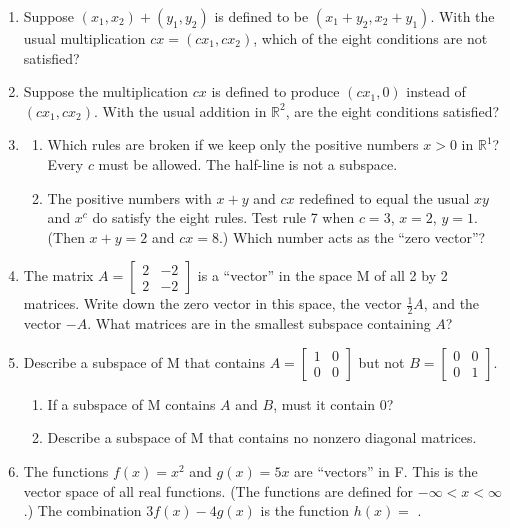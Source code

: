 \documentclass[14pt, a4paper]{article}
\begin{document}
\begin{enumerate}
    \item Suppose $(x_1,x_2)+(y_1,y_2)$ is defined to be $(x_1+y_2,x_2+y_1)$. With the usual multiplication $cx=(cx_1,cx_2)$, which of the eight conditions are not satisfied?

    \item Suppose the multiplication $cx$ is defined to produce $(cx_1,0)$ instead of $(cx_1,cx_2)$. With the usual addition in $\mathbb{R}^2$, are the eight conditions satisfied?

    \item
          \begin{enumerate}
              \item Which rules are broken if we keep only the positive numbers $x>0$ in $\mathbb{R}^1$? Every $c$ must be allowed. The half-line is not a subspace.
              \item The positive numbers with $x+y$ and $cx$ redefined to equal the usual $xy$ and $x^c$ do satisfy the eight rules. Test rule 7 when $c=3$, $x=2$, $y=1$. (Then $x+y=2$ and $cx=8$.) Which number acts as the ``zero vector''?
          \end{enumerate}

    \item The matrix $A=\begin{bmatrix}2&-2\\2&-2\end{bmatrix}$ is a ``vector'' in the space M of all 2 by 2 matrices. Write down the zero vector in this space, the vector $\frac12 A$, and the vector $-A$. What matrices are in the smallest subspace containing $A$?

    \item Describe a subspace of M that contains $A=\begin{bmatrix}1&0\\0&0\end{bmatrix}$ but not $B=\begin{bmatrix}0&0\\0&1\end{bmatrix}$.
          \begin{enumerate}
              \item If a subspace of M contains $A$ and $B$, must it contain $0$?
              \item Describe a subspace of M that contains no nonzero diagonal matrices.
          \end{enumerate}

    \item The functions $f(x)=x^2$ and $g(x)=5x$ are ``vectors'' in F. This is the vector space of all real functions. (The functions are defined for $-\infty < x < \infty$.) The combination $3f(x)-4g(x)$ is the function $h(x)=$ \underline{\hspace{3cm}}.


\end{enumerate}
\end{document}
